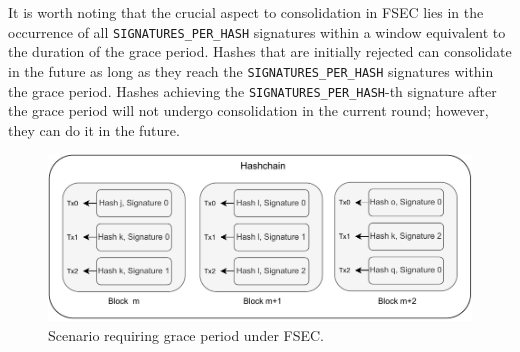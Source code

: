 It is worth noting that the crucial aspect to consolidation in FSEC lies in the
occurrence of all \texttt{SIGNATURES\_PER\_HASH} signatures within a window
equivalent to the duration of the grace period.
%
Hashes that are initially rejected can consolidate in the future as long as
they reach the \texttt{SIGNATURES\_PER\_HASH} signatures within the grace period.
%
Hashes achieving the \texttt{SIGNATURES\_PER\_HASH}-th signature after
the grace period will not undergo consolidation in the current round;
however, they can do it in the future.

\begin{figure}
  \centering
  \includegraphics[scale=0.5]{figures/grace_period.pdf}
  \caption{Scenario requiring grace period under FSEC.}
  \label{fig:grace_period}
\end{figure}


